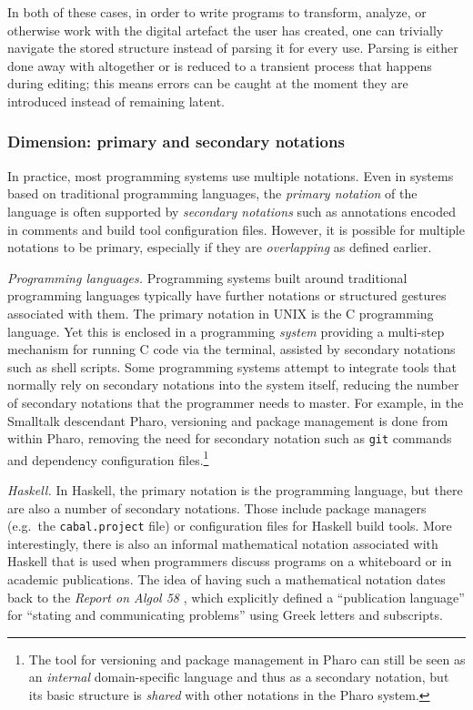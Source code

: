 \documentclass[english,submission]{programming}
\begin{document}
In both of these cases, in order to write programs to transform,
analyze, or otherwise work with the digital artefact the user has
created, one can trivially navigate the stored structure instead of
parsing it for every use. Parsing is either done away with altogether or
is reduced to a transient process that happens during editing; this
means errors can be caught at the moment they are introduced instead of
remaining latent.

\hypertarget{dimension-primary-and-secondary-notations}{%
\subsubsection{Dimension: primary and secondary
notations}\label{dimension-primary-and-secondary-notations}}

In practice, most programming systems use multiple notations. Even in
systems based on traditional programming languages, the \emph{primary
notation} of the language is often supported by \emph{secondary
notations} such as annotations encoded in comments and build tool
configuration files. However, it is possible for multiple notations to
be primary, especially if they are \emph{overlapping} as defined
earlier.

\emph{Programming languages.} Programming systems built around
traditional programming languages typically have further notations or
structured gestures associated with them. The primary notation in UNIX
is the C programming language. Yet this is enclosed in a programming
\emph{system} providing a multi-step mechanism for running C code via
the terminal, assisted by secondary notations such as shell scripts.
Some programming systems attempt to integrate tools that normally rely
on secondary notations into the system itself, reducing the number of
secondary notations that the programmer needs to master. For example, in
the Smalltalk descendant Pharo, versioning and package management is
done from within Pharo, removing the need for secondary notation such as
\texttt{git} commands and dependency configuration files.\footnote{The
  tool for versioning and package management in Pharo can still be seen
  as an \emph{internal} domain-specific language and thus as a secondary
  notation, but its basic structure is \emph{shared} with other
  notations in the Pharo system.}

\emph{Haskell.} In Haskell, the primary notation is the programming
language, but there are also a number of secondary notations. Those
include package managers (e.g.~the \texttt{cabal.project} file) or
configuration files for Haskell build tools. More interestingly, there
is also an informal mathematical notation associated with Haskell that
is used when programmers discuss programs on a whiteboard or in academic
publications. The idea of having such a mathematical notation dates back
to the \emph{Report on Algol 58} \cite{Alg58}, which explicitly defined
a ``publication language'' for ``stating and communicating problems''
using Greek letters and subscripts.
\end{document}
